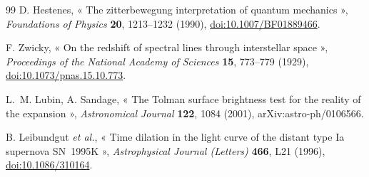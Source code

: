 \begin{thebibliography}{99}
D. Hestenes,
« The zitterbewegung interpretation of quantum mechanics »,
\emph{Foundations of Physics} \textbf{20}, 1213--1232 (1990),
\href{https://doi.org/10.1007/BF01889466}{doi:10.1007/BF01889466}.

F. Zwicky,
« On the redshift of spectral lines through interstellar space »,
\emph{Proceedings of the National Academy of Sciences} \textbf{15}, 773--779 (1929),
\href{https://doi.org/10.1073/pnas.15.10.773}{doi:10.1073/pnas.15.10.773}.

L.~M. Lubin, A. Sandage,
« The Tolman surface brightness test for the reality of the expansion »,
\emph{Astronomical Journal} \textbf{122}, 1084 (2001),
arXiv:astro-ph/0106566.

B. Leibundgut \emph{et al.},
« Time dilation in the light curve of the distant type Ia supernova SN~1995K »,
\emph{Astrophysical Journal (Letters)} \textbf{466}, L21 (1996),
\href{https://doi.org/10.1086/310164}{doi:10.1086/310164}.

\end{thebibliography}
\endgroup


